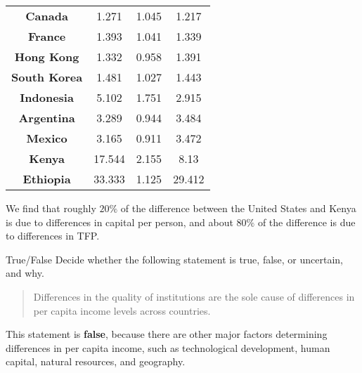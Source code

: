 \documentclass[8pt]{extarticle}
\begin{document}
\begin{center}
\begin{tabular}{c|ccc}
        \textbf{Canada} & 1.271 & 1.045 & 1.217 \\ 
        \textbf{France} & 1.393 & 1.041 & 1.339 \\ 
        \textbf{Hong Kong} & 1.332 & 0.958 & 1.391 \\ 
        \textbf{South Korea} & 1.481 & 1.027 & 1.443 \\ 
        \textbf{Indonesia} & 5.102 & 1.751 & 2.915 \\ 
        \textbf{Argentina} & 3.289 & 0.944 & 3.484 \\ 
        \textbf{Mexico} & 3.165 & 0.911 & 3.472 \\ 
        \textbf{Kenya} & 17.544 & 2.155 & 8.13 \\ 
        \textbf{Ethiopia} & 33.333 & 1.125 & 29.412 \\ \hline
    \end{tabular}
  \end{center}
We find that roughly $20\%$ of the difference between the United States and Kenya is due to differences in capital per person, and about $80\%$ of the difference is due to differences in TFP.
\begin{mathbox}{True/False}
    Decide whether the following statement is true, false, or uncertain, and why.
      \begin{quote}
        Differences in the quality of institutions are the sole cause of differences in per capita income levels across countries.
      \end{quote}
  \end{mathbox}
\noindent This statement is \textbf{false}, because there are other major factors determining differences in per capita income, such as technological development, human capital, natural resources, and geography.
\end{document}
